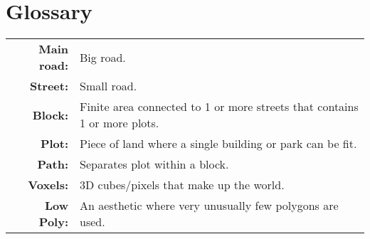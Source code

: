 \section*{Glossary}

\begin{table}[h!]
    \centering
    \begin{tabular}{rl}
        \textbf{Main road:} & Big road.                                                                 \\
        \textbf{Street:}    & Small road.                                                             \\
        \textbf{Block:}     & Finite area connected to 1 or more streets that contains 1 or more plots. \\
        \textbf{Plot:}      & Piece of land where a single building or park can be fit.                 \\
        \textbf{Path:}      & Separates plot within a block.                                            \\
        \textbf{Voxels:}    & 3D cubes/pixels that make up the world.                                   \\
        \textbf{Low Poly:}  & An aesthetic where very unusually few polygons are used.                 
    \end{tabular}
\end{table}